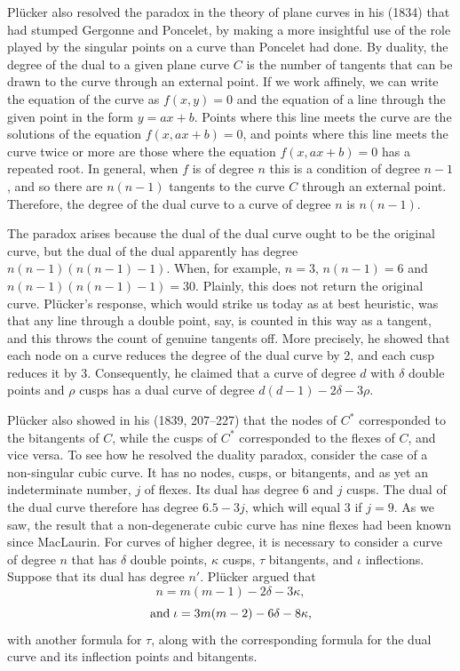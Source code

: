 \documentclass[11pt]{article}
\begin{document}
Pl\"ucker also resolved the paradox in the theory of plane curves in his (1834) that had stumped Gergonne and Poncelet, by making a more insightful use of the role played by the singular points on a curve than Poncelet had done. By duality, the degree of the dual to a given plane curve $C$ is the number of tangents that can be drawn to the curve through an external point. If we work affinely, we can write the equation of the curve as $f(x, y) =0$ and the equation of a line through the given point in the form $y = ax + b.$ Points where this line meets the curve are the solutions of the equation $f(x, ax+b)=0$, and points where this line meets the curve twice or more are those where the equation $f(x, ax+b)=0$ has a repeated root. In general, when $f$ is of degree $n$ this is a condition of degree $n-1$, and so there are $n(n-1)$ tangents to the curve $C$ through an external point. Therefore, the degree of the dual curve to a curve of degree $n$ is $n(n-1).$

The paradox arises because the dual of the dual curve ought to be the original curve, but the dual of the dual apparently has degree $n(n-1)(n(n-1)-1).$ When, for example, $n=3$, $n(n-1) = 6$ and $n(n-1)(n(n-1)-1) = 30.$ Plainly, this does not return the original curve. Pl\"ucker's response, which would strike us today as at best heuristic, was that any line through a double point, say, is counted in this way as a tangent, and this throws the count of genuine tangents off. More precisely, he  showed that each node on a curve reduces the degree of the dual curve by 2, and each cusp reduces it by 3. Consequently, he claimed that  a curve of degree $d$ with $\delta$ double points and $\rho$ cusps has a dual curve  of degree $d(d-1) -  2\delta - 3\rho.$ 


Pl\"ucker also showed in his (1839, 207--227) that the nodes of $C^{*}$  corresponded to the bitangents of $C$, while the cusps of $C^{*}$ corresponded to the flexes of $C$, and vice versa. To see how he resolved the duality paradox, consider  the case of a non-singular cubic curve. It has no nodes, cusps, or bitangents, and as yet an indeterminate number, $j$ of flexes. Its dual has degree 6 and $j$ cusps. The dual of the dual curve therefore has degree $6.5 - 3j$, which will equal 3 if $j = 9.$ As we saw, the result that a non-degenerate cubic curve has nine flexes had been known since MacLaurin. For curves of higher degree, it is necessary to consider a curve of degree $n$ that has $\delta$ double points, $\kappa$ cusps, $\tau$ bitangents, and $\iota$ inflections. Suppose that its dual has degree $n'$. Pl\"ucker argued that
\[n = m(m-1) - 2\delta - 3 \kappa,\]
\[{\rm and}\; \iota = 3m(m-2) - 6\delta - 8\kappa,\]
with another formula for $\tau$, along with the corresponding formula for the dual curve and its inflection points and bitangents.
\end{document}

